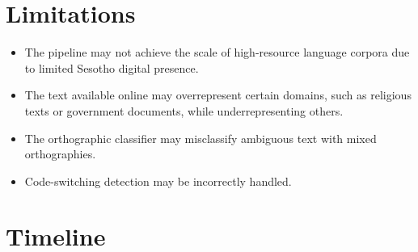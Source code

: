 \documentclass[11pt,a4paper]{article}
\begin{document}
\section{Limitations}
\begin{itemize}
    \item The pipeline may not achieve the scale of high-resource language corpora due to limited Sesotho digital presence.
    \item The text available online may overrepresent certain domains, such as religious texts or government documents, while underrepresenting others.
    \item The orthographic classifier may misclassify ambiguous text with mixed orthographies. 
    \item  Code-switching detection may be incorrectly handled.
\end{itemize}

\section{Timeline}
\end{document}
